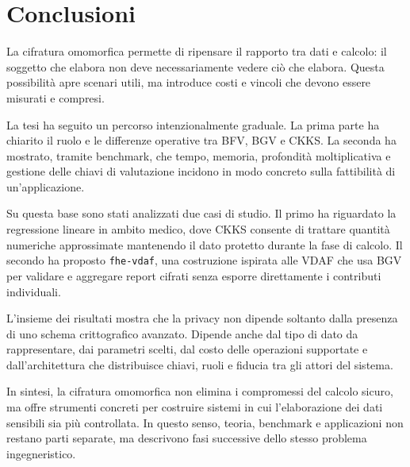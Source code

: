 \chapter{Conclusioni}

La cifratura omomorfica permette di ripensare il rapporto tra dati e calcolo: il soggetto che elabora non deve necessariamente vedere ci\`o che elabora. Questa possibilit\`a apre scenari utili, ma introduce costi e vincoli che devono essere misurati e compresi.

La tesi ha seguito un percorso intenzionalmente graduale. La prima parte ha chiarito il ruolo e le differenze operative tra BFV, BGV e CKKS. La seconda ha mostrato, tramite benchmark, che tempo, memoria, profondit\`a moltiplicativa e gestione delle chiavi di valutazione incidono in modo concreto sulla fattibilit\`a di un'applicazione.

Su questa base sono stati analizzati due casi di studio. Il primo ha riguardato la regressione lineare in ambito medico, dove CKKS consente di trattare quantit\`a numeriche approssimate mantenendo il dato protetto durante la fase di calcolo. Il secondo ha proposto \texttt{fhe-vdaf}, una costruzione ispirata alle VDAF che usa BGV per validare e aggregare report cifrati senza esporre direttamente i contributi individuali.

L'insieme dei risultati mostra che la privacy non dipende soltanto dalla presenza di uno schema crittografico avanzato. Dipende anche dal tipo di dato da rappresentare, dai parametri scelti, dal costo delle operazioni supportate e dall'architettura che distribuisce chiavi, ruoli e fiducia tra gli attori del sistema.

In sintesi, la cifratura omomorfica non elimina i compromessi del calcolo sicuro, ma offre strumenti concreti per costruire sistemi in cui l'elaborazione dei dati sensibili sia pi\`u controllata. In questo senso, teoria, benchmark e applicazioni non restano parti separate, ma descrivono fasi successive dello stesso problema ingegneristico.
